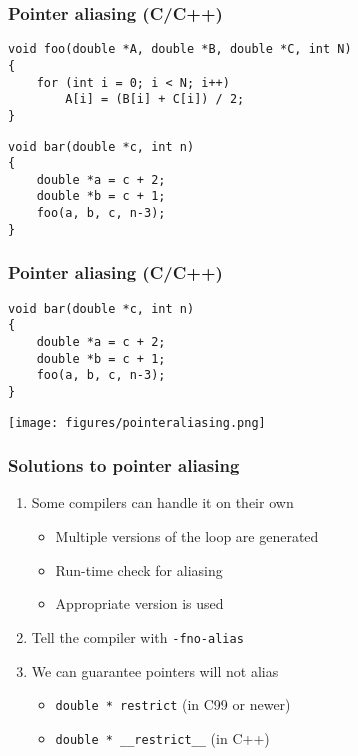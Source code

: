 \documentclass[14pt,aspectratio=169,dvipsnames,table]{beamer}
\begin{document}
\begin{frame}[fragile]
  \frametitle{Pointer aliasing (C/C++)}
  \vskip -4pt
\begin{lstlisting}
void foo(double *A, double *B, double *C, int N)
{
    for (int i = 0; i < N; i++)
        A[i] = (B[i] + C[i]) / 2;
}
\end{lstlisting}
\begin{lstlisting}
void bar(double *c, int n)
{
    double *a = c + 2;
    double *b = c + 1;
    foo(a, b, c, n-3);
}
\end{lstlisting}

\end{frame}






\begin{frame}[fragile]
  \frametitle{Pointer aliasing (C/C++)}
\begin{lstlisting}
void bar(double *c, int n)
{
    double *a = c + 2;
    double *b = c + 1;
    foo(a, b, c, n-3);
}
\end{lstlisting}
  \begin{center}
    \texttt{[image: figures/pointeraliasing.png]}
  \end{center}
\end{frame}

\begin{frame}[fragile]
  \frametitle{Solutions to pointer aliasing}
  \begin{enumerate}[itemsep=9pt]
  \item<1-> Some compilers can handle it on their own
    \begin{itemize}[itemsep=4pt]
    \item Multiple versions of the loop are generated
    \item Run-time check for aliasing
    \item Appropriate version is used
    \end{itemize}
  \item<2-> Tell the compiler with \texttt{-fno-alias}
  \item<3-> We can guarantee pointers will not alias
    \begin{itemize}[itemsep=4pt]
    \item \texttt{double * restrict} (in C99 or newer)
    \item \texttt{double * \_\_restrict\_\_} (in C++)
    \end{itemize}
  \end{enumerate}
\end{frame}
\end{document}
